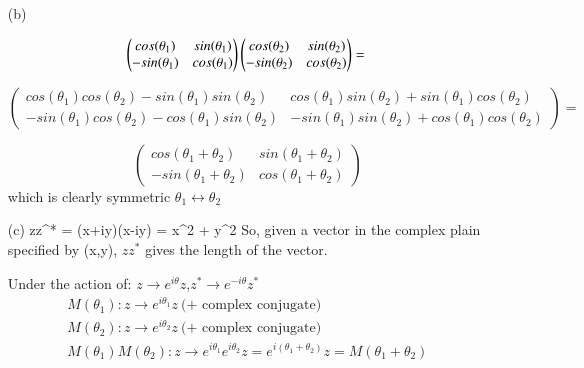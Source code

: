 {{\begin{itemize}
{  
}
\item[(b)]{

\begin{equation*}
\begin{pmatrix}  cos(\theta_1) & sin(\theta_1) \\ -sin(\theta_1) & cos(\theta_1) \end{pmatrix} 
\begin{pmatrix}  cos(\theta_2) & sin(\theta_2) \\ -sin(\theta_2) & cos(\theta_2) \end{pmatrix}  = \\
\end{equation*}

\begin{equation*}
\begin{pmatrix}  
cos(\theta_1)cos(\theta_2) - sin(\theta_1)sin(\theta_2) & cos(\theta_1)sin(\theta_2) + sin(\theta_1)cos(\theta_2) \\ 
-sin(\theta_1)cos(\theta_2) - cos(\theta_1)sin(\theta_2) & -sin(\theta_1)sin(\theta_2) + cos(\theta_1)cos(\theta_2) 
\end{pmatrix}  = 
\end{equation*}

\begin{equation*}
\begin{pmatrix}  
cos(\theta_1 + \theta_2)  & sin(\theta_1 + \theta_2) \\ 
-sin(\theta_1 + \theta_2) & cos(\theta_1 + \theta_2)
\end{pmatrix}  
\end{equation*}
which is clearly symmetric $\theta_1 \leftrightarrow \theta_2$

}

\item[(c)]{
\be
zz^* = (x+iy)(x-iy) = x^2 + y^2
\ee
So, given a vector in the complex plain specified by (x,y), $zz^*$ gives the length of the vector.
}

Under the action of: $z\rightarrow e^{i\theta}z$,$z^*\rightarrow e^{-i\theta}z^*$
\begin{align*}
M(\theta_1): z\rightarrow e^{i\theta_1}z\ \textrm{(+ complex conjugate)}\\
M(\theta_2): z\rightarrow e^{i\theta_2}z\ \textrm{(+ complex conjugate)}\\
M(\theta_1)M(\theta_2): z\rightarrow e^{i\theta_1}e^{i\theta_2}z = e^{i(\theta_1+\theta_2)}z = M(\theta_1 + \theta_2)
\end{align*}


\end{itemize}}}
